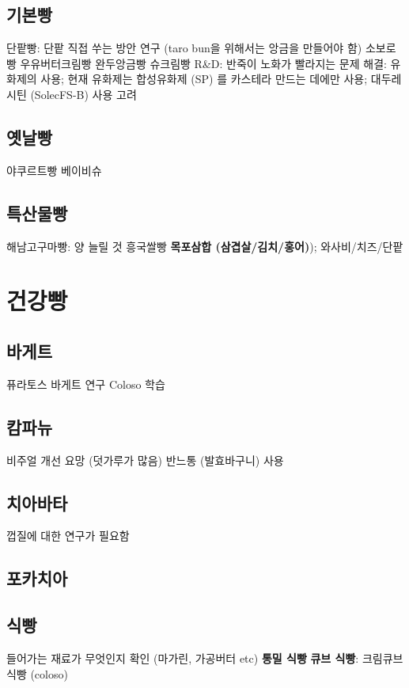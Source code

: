 \documentclass{myproc}
\begin{document}
\subsection{\textcolor{blue2}{기본빵}}
\bit
\w 단팥빵: 단팥 직접 쑤는 방안 연구 (taro bun을 위해서는 앙금을 만들어야 함)
\w 소보로빵
\w 우유버터크림빵
\w 완두앙금빵
\w 슈크림빵
\w \textcolor{red2}{R\&D}: 반죽이 노화가 빨라지는 문제 해결:
\textcolor{red2}{유화제}의 사용; 현재 유화제는
합성유화제 (SP) 를 카스테라 만드는 데에만 사용; 대두레시틴 (SolecFS-B) 사용 고려
\eit
\subsection{\textcolor{blue2}{옛날빵}}
\bit
\w 야쿠르트빵
\w 베이비슈
\eit

\subsection{\textcolor{blue2}{특산물빵}}
\bit
\w 해남고구마빵: 양 늘릴 것
\w 흥국쌀빵
\w \textcolor{green2}{\bf{목포삼합 (삼겹살/김치/홍어)}}); 와사비/치즈/단팥
\eit

\section{\textcolor{red2}{건강빵}}
\subsection{\textcolor{blue2}{바게트}}
\bit
\w 퓨라토스 바게트 연구
\w Coloso 학습
\eit

\subsection{\textcolor{blue2}{캄파뉴}}
\bit
\w 비주얼 개선 요망 (덧가루가 많음)
\w 반느통 (발효바구니) 사용 
\eit

\subsection{\textcolor{blue2}{치아바타}}
\bit
\w 껍질에 대한 연구가 필요함
\eit

\subsection{\textcolor{blue2}{포카치아}}

\subsection{\textcolor{blue2}{식빵}}
\bit
\w 들어가는 재료가 무엇인지 확인 (마가린, 가공버터 etc)
\w \textcolor{green2}{\bf{}통밀 식빵}
\w \textcolor{green2}{\bf{}큐브 식빵}: 크림큐브식빵 (coloso)
\eit
\end{document}
